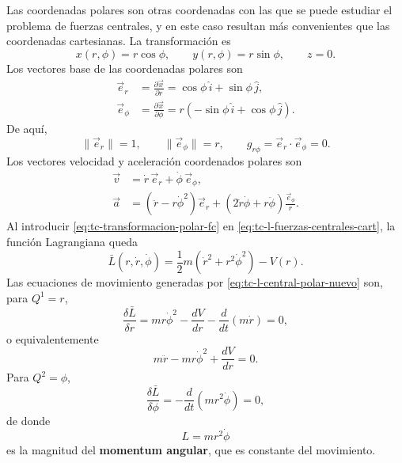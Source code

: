 \documentclass[../apunte_mecanica_clasica.tex]{subfiles}
\begin{document}
Las coordenadas polares son otras coordenadas con las que se puede estudiar el problema de fuerzas centrales, y en este caso resultan más convenientes que las coordenadas cartesianas. La transformación es
\begin{equation}
    x(r,\phi)=r\cos\phi,
    \qquad
    y(r,\phi)=r\sin\phi,
    \qquad
    z=0.
    \label{eq:tc-transformacion-polar-fc}
\end{equation}
Los vectores base de las coordenadas polares son
\begin{align}
    \vec e_r&=\frac{\partial \vec x}{\partial r}
    =\cos\phi\,\hat i+\sin\phi\,\hat j,
    \label{eq:tc-er-polar}\\
    \vec e_\phi&=\frac{\partial \vec x}{\partial \phi}
    =r\left(-\sin\phi\,\hat i+\cos\phi\,\hat j\right).
    \label{eq:tc-ephi-polar}
\end{align}
De aquí,
\begin{equation}
    \lVert \vec e_r\rVert=1,
    \qquad
    \lVert \vec e_\phi\rVert=r,
    \qquad
    g_{r\phi}=\vec e_r\cdot \vec e_\phi=0.
    \label{eq:tc-metrica-polar}
\end{equation}
Los vectores velocidad y aceleración coordenados polares son
\begin{align}
    \vec v&=\dot r\,\vec e_r+\dot\phi\,\vec e_\phi,
    \label{eq:tc-velocidad-polar}\\
    \vec a&=(\ddot r-r\dot\phi^2)\vec e_r+
    \left(2\dot r\dot\phi+r\ddot\phi\right)\frac{\vec e_\phi}{r}.
    \label{eq:tc-aceleracion-polar}
\end{align}
Al introducir \eqref{eq:tc-transformacion-polar-fc} en \eqref{eq:tc-l-fuerzas-centrales-cart}, la función Lagrangiana queda
\begin{equation}
    \bar L(r,\dot r,\dot\phi)
    =\frac{1}{2}m(\dot r^2+r^2\dot\phi^2)-V(r).
    \label{eq:tc-l-central-polar-nuevo}
\end{equation}
Las ecuaciones de movimiento generadas por \eqref{eq:tc-l-central-polar-nuevo} son, para \(Q^1=r\),
\begin{equation}
    \frac{\delta \bar L}{\delta r}
    =m r\dot\phi^2-\frac{dV}{dr}-\frac{d}{dt}(m\dot r)=0,
    \label{eq:tc-eq-r-polar}
\end{equation}
o equivalentemente
\begin{equation}
    m\ddot r-mr\dot\phi^2+\frac{dV}{dr}=0.
    \label{eq:tc-eq-r-polar-final}
\end{equation}
Para \(Q^2=\phi\),
\begin{equation}
    \frac{\delta \bar L}{\delta \phi}
    =-\frac{d}{dt}\left(mr^2\dot\phi\right)=0,
    \label{eq:tc-eq-phi-polar}
\end{equation}
de donde
\begin{equation}
    L=mr^2\dot\phi
    \label{eq:tc-momento-angular-central}
\end{equation}
es la magnitud del \textbf{momentum angular}, que es constante del movimiento.
\end{document}
